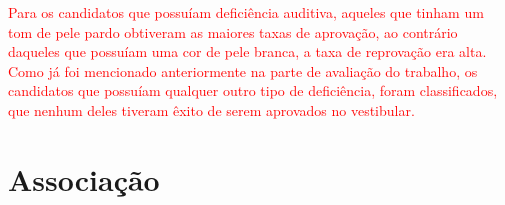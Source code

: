 \par
\textcolor{red}{Para os candidatos que possuíam deficiência auditiva, aqueles que tinham um tom de pele pardo obtiveram as maiores taxas de aprovação, ao contrário daqueles que possuíam uma cor de pele branca, a taxa de reprovação era alta. Como já foi mencionado anteriormente na parte de avaliação do trabalho, os candidatos que possuíam qualquer outro tipo de deficiência, foram classificados, que nenhum deles tiveram êxito de serem aprovados no vestibular.}


\section{Associação}

\textcolor{red}{}

